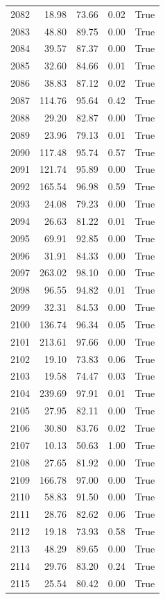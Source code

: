 \begin{longtable}{rrrrr}
2082 & 18.98 & 73.66 & 0.02 & True \\
2083 & 48.80 & 89.75 & 0.00 & True \\
2084 & 39.57 & 87.37 & 0.00 & True \\
2085 & 32.60 & 84.66 & 0.01 & True \\
2086 & 38.83 & 87.12 & 0.02 & True \\
2087 & 114.76 & 95.64 & 0.42 & True \\
2088 & 29.20 & 82.87 & 0.00 & True \\
2089 & 23.96 & 79.13 & 0.01 & True \\
2090 & 117.48 & 95.74 & 0.57 & True \\
2091 & 121.74 & 95.89 & 0.00 & True \\
2092 & 165.54 & 96.98 & 0.59 & True \\
2093 & 24.08 & 79.23 & 0.00 & True \\
2094 & 26.63 & 81.22 & 0.01 & True \\
2095 & 69.91 & 92.85 & 0.00 & True \\
2096 & 31.91 & 84.33 & 0.00 & True \\
2097 & 263.02 & 98.10 & 0.00 & True \\
2098 & 96.55 & 94.82 & 0.01 & True \\
2099 & 32.31 & 84.53 & 0.00 & True \\
2100 & 136.74 & 96.34 & 0.05 & True \\
2101 & 213.61 & 97.66 & 0.00 & True \\
2102 & 19.10 & 73.83 & 0.06 & True \\
2103 & 19.58 & 74.47 & 0.03 & True \\
2104 & 239.69 & 97.91 & 0.01 & True \\
2105 & 27.95 & 82.11 & 0.00 & True \\
2106 & 30.80 & 83.76 & 0.02 & True \\
2107 & 10.13 & 50.63 & 1.00 & True \\
2108 & 27.65 & 81.92 & 0.00 & True \\
2109 & 166.78 & 97.00 & 0.00 & True \\
2110 & 58.83 & 91.50 & 0.00 & True \\
2111 & 28.76 & 82.62 & 0.06 & True \\
2112 & 19.18 & 73.93 & 0.58 & True \\
2113 & 48.29 & 89.65 & 0.00 & True \\
2114 & 29.76 & 83.20 & 0.24 & True \\
2115 & 25.54 & 80.42 & 0.00 & True \\

\end{longtable}
